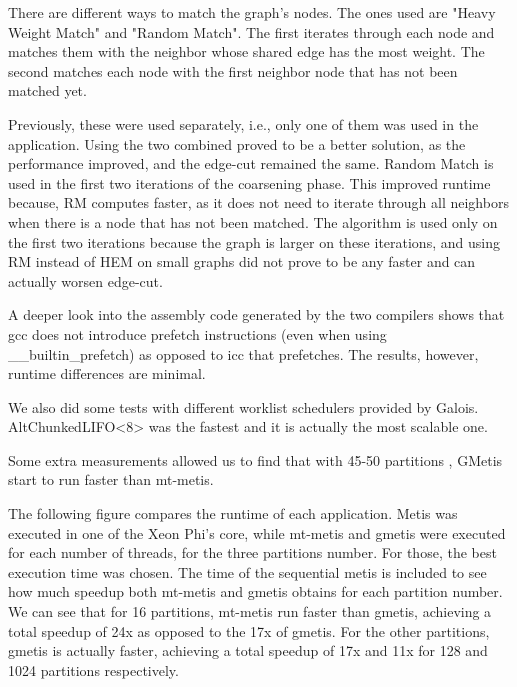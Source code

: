 \documentclass[abstract=on,9pt,twocolumn]{scrartcl}
\begin{document}

There are different ways to match the graph's nodes. The ones used are
"Heavy Weight Match" and "Random Match". The first iterates through each
node and matches them with the neighbor whose shared edge has the most
weight. The second matches each node with the first neighbor node that
has not been matched yet.

Previously, these were used separately, i.e., only one of them was
used in the application. Using the two combined proved to be a better
solution, as the performance improved, and the edge-cut remained the
same. Random Match is used in the first two iterations of the coarsening
phase. This improved runtime because, RM computes faster, as it does not
need to iterate through all neighbors when there is a node that has not
been matched. The algorithm is used only on the first two iterations
because the graph is larger on these iterations, and using RM instead of
HEM on small graphs did not prove to be any faster and can actually worsen
edge-cut.

A deeper look into the assembly code generated by the two compilers
shows that gcc does not introduce prefetch instructions (even when using
\_\_builtin\_prefetch) as opposed to icc that prefetches. The results,
however, runtime differences are minimal.

We also did some tests with different worklist schedulers provided by
Galois. AltChunkedLIFO<8> was the fastest and it is actually the most
scalable one.

Some extra measurements allowed us to find that with 45-50 partitions
, GMetis start to run faster than mt-metis.



The following figure compares the runtime of each application. Metis was
executed in one of the Xeon Phi's core, while mt-metis and gmetis were executed
for each number of threads, for the three partitions number. For those, the best execution time was
chosen. The time of the sequential metis is included to see how much
speedup both mt-metis and gmetis obtains for each partition number. 
We can see that for 16 partitions, mt-metis run faster than gmetis,
achieving a total speedup of 24x as opposed to the 17x of gmetis.
For the other partitions, gmetis is actually faster, achieving a total
speedup of 17x and 11x for 128 and 1024 partitions respectively.
\end{document}
